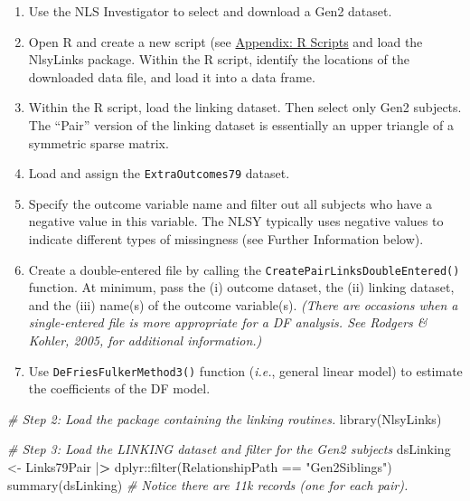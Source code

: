 \documentclass[smallextended]{svjour3}       %
\providecommand{\tightlist}{%
  \setlength{\itemsep}{0pt}\setlength{\parskip}{0pt}}
\newenvironment{Shaded}{\begin{snugshade}}{\end{snugshade}}
\newcommand{\CommentTok}[1]{\textcolor[rgb]{0.56,0.35,0.01}{\textit{#1}}}
\newcommand{\ErrorTok}[1]{\textcolor[rgb]{0.64,0.00,0.00}{\textbf{#1}}}
\newcommand{\FunctionTok}[1]{\textcolor[rgb]{0.00,0.00,0.00}{#1}}
\newcommand{\NormalTok}[1]{#1}
\newcommand{\OtherTok}[1]{\textcolor[rgb]{0.56,0.35,0.01}{#1}}
\newcommand{\SpecialCharTok}[1]{\textcolor[rgb]{0.00,0.00,0.00}{#1}}
\newcommand{\StringTok}[1]{\textcolor[rgb]{0.31,0.60,0.02}{#1}}
\begin{document}
\begin{enumerate}
\def\labelenumi{\arabic{enumi}.}
\tightlist
\item
  Use the NLS Investigator to select and download a Gen2 dataset.
\item
  Open R and create a new script (see
  \protect\hyperlink{appendix-creating-and-saving-r-scripts}{Appendix: R
  Scripts} and load the NlsyLinks package. Within the R script, identify
  the locations of the downloaded data file, and load it into a data
  frame.
\item
  Within the R script, load the linking dataset. Then select only Gen2
  subjects. The ``Pair'' version of the linking dataset is essentially
  an upper triangle of a symmetric sparse matrix.
\item
  Load and assign the \texttt{ExtraOutcomes79} dataset.
\item
  Specify the outcome variable name and filter out all subjects who have
  a negative value in this variable. The NLSY typically uses negative
  values to indicate different types of missingness (see Further
  Information below).
\item
  Create a double-entered file by calling the
  \texttt{CreatePairLinksDoubleEntered()} function. At minimum, pass the
  (i) outcome dataset, the (ii) linking dataset, and the (iii) name(s)
  of the outcome variable(s). \emph{(There are occasions when a
  single-entered file is more appropriate for a DF analysis. See Rodgers
  \& Kohler, 2005, for additional information.)}
\item
  Use \texttt{DeFriesFulkerMethod3()} function (\emph{i.e.}, general
  linear model) to estimate the coefficients of the DF model.
\end{enumerate}

\begin{Shaded}
\begin{Highlighting}[]
\CommentTok{\# Step 2: Load the package containing the linking routines.}
\FunctionTok{library}\NormalTok{(NlsyLinks)}

\CommentTok{\# Step 3: Load the LINKING dataset and filter for the Gen2 subjects}
\NormalTok{dsLinking }\OtherTok{\textless{}{-}}
\NormalTok{  Links79Pair }\SpecialCharTok{|}\ErrorTok{\textgreater{}}
\NormalTok{  dplyr}\SpecialCharTok{::}\FunctionTok{filter}\NormalTok{(RelationshipPath }\SpecialCharTok{==} \StringTok{"Gen2Siblings"}\NormalTok{)}
\FunctionTok{summary}\NormalTok{(dsLinking) }\CommentTok{\# Notice there are 11k records (one for each pair).}
\end{Highlighting}
\end{Shaded}
\end{document}
